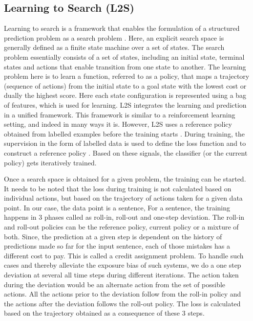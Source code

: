 \documentclass[11pt]{article}
\begin{document}



\subsection{Learning to Search (L2S)}
Learning to search is a framework that enables the formulation of a structured prediction problem as a search problem \cite{ross2011reduction,collins2004incremental,daume2009search}. Here,  an explicit search space is generally defined as a finite state machine over a set of states. The search problem essentially consists of a set of states, including an initial state, terminal states and actions that enable transition from one state to another.  The learning problem here is to learn a function, referred to as a  policy, that maps a trajectory (sequence of actions) from the initial state to a goal state with the lowest cost or dually the highest score. Here each state configuration is represented using a bag of features, which is used for learning.  L2S integrates the learning and prediction in a unified framework. This framework is similar to a reinforcement learning setting, and indeed in many ways it is. However, L2S uses a reference policy obtained from labelled examples before the training starts \cite{pmlr-v37-changb15searchteacher}.  During training, the supervision in the form of labelled data is used  to define the loss function and to construct a reference policy \cite{credit_asg}.  Based on these signals, the classifier (or the current policy) gets iteratively trained.

Once a search space is obtained for a given problem, the training can be started. It needs to be noted that the loss during training is not calculated based on individual actions, but based on the trajectory of actions taken for a given data point. In our case, the data point is a sentence, For a sentence, the training happens in 3 phases called as roll-in, roll-out and one-step deviation. The roll-in and roll-out policies can be the reference policy, current policy or a mixture of both. Since, the prediction at a given step is dependent on the history of predictions made so far for the input sentence, each of those mistakes has a different cost to pay. This is called a credit assignment problem. To handle such cases and thereby alleviate the exposure bias of such systems, we do a one step deviation at several  all time steps during different iterations. The action taken during the deviation would be an alternate action from the set of possible actions. All the actions prior to the deviation follow from the roll-in policy and the actions after the deviation follows the roll-out policy. The loss is calculated based on the trajectory obtained as a consequence of these 3 steps. 
\end{document}
